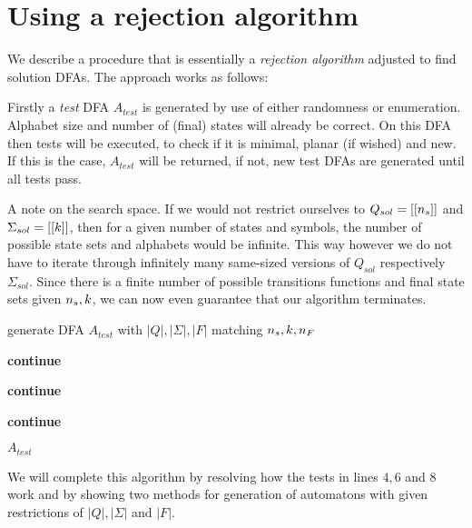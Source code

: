 \section{Using a rejection algorithm}

We describe a procedure that is essentially a \emph{rejection algorithm} adjusted to find solution DFAs. The approach works as follows:

Firstly a \emph{test} DFA $A_{test}$ is generated by use of either randomness or enumeration. Alphabet size and number of (final) states will already be correct. On this DFA then tests will be executed, to check if it is minimal, planar (if wished) and new. If this is the case, $A_{test}$ will be returned, if not, new test DFAs are generated until all tests pass.

A note on the search space. If we would not restrict ourselves to $Q_{sol} = [[{n_s}]]$ and $\Sigma_{sol} = [[k]]$, then for a given number of states and symbols, the number of possible state sets and alphabets would be infinite. This way however we do not have to iterate through infinitely many same-sized versions of $Q_{sol}$ respectively $\Sigma_{sol}$. Since there is a finite number of possible transitions functions and final state sets given ${n_s}, k$, we can now even guarantee that our algorithm terminates.

\vspace{0.2cm}
\begin{algorithmic}[1]
		
			\vspace{0.2cm}
		
			\State generate DFA $A_{test}$ with $|Q|, |\Sigma|, |F|$ matching ${n_s}, k, {n_F}$
			
			\vspace{0.2cm}
			
				\State \textbf{continue}
			\EndIf
			
				\State \textbf{continue}
			\EndIf
			
				\State \textbf{continue}
			\EndIf
			
			\vspace{0.2cm}
			
			\State\Return $A_{test}$
		\EndWhile
	\EndFunction
\end{algorithmic}
\vspace{0.2cm}
We will complete this algorithm by resolving how the tests in lines $4, 6$ and $8$ work and by showing two methods for generation of automatons with given restrictions of $|Q|, |\Sigma|$ and $|F|$.

